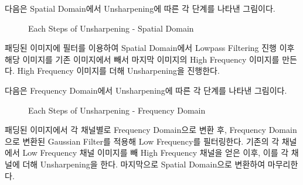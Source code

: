 \documentclass{report}
\begin{document}

다음은 Spatial Domain에서 Unsharpening에 따른 각 단계를 나타낸 그림이다.

\begin{figure}[htbp]
    \centering
    \caption{Each Steps of Unsharpening - Spatial Domain}
\end{figure}

패딩된 이미지에 필터를 이용하여 Spatial Domain에서 Lowpass Filtering 진행 이후 해당 이미지를 기존 이미지에서 빼서 마지막 이미지의 High Frequency 이미지를 만든다.
High Frequency 이미지를 더해 Unsharpening을 진행한다.

\newpage


다음은 Frequency Domain에서 Unsharpening에 따른 각 단계를 나타낸 그림이다.

\begin{figure}[htbp]
    \centering
    \caption{Each Steps of Unsharpening - Frequency Domain}
\end{figure}

패딩된 이미지에서 각 채널별로 Frequency Domain으로 변환 후, Frequency Domain으로 변환된 Gaussian Filter를 적용해 Low Frequency를 필터링한다.
기존의 각 채널에서 Low Frequency 채널 이미지를 빼 High Frequency 채널을 얻은 이후, 이를 각 채널에 더해 Unsharpening을 한다.
마지막으로 Spatial Domain으로 변환하여 마무리한다.

\end{document}
